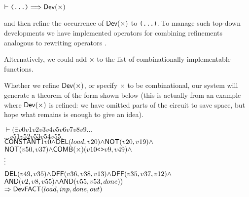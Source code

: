 \documentclass{llncs}
\begin{document}
\vspace*{-2mm}

{\baselineskip10pt\begin{alltt}
\( \vdash \texttt{(...)} \Longrightarrow \DEF{Dev}({\times}) \)
\end{alltt}}

\vspace*{-2mm}

\noindent and then refine the occurrence of $\mathsf{Dev}(\times)$
to \texttt{(...)}. To manage such top-down developments we have
implemented operators for combining refinements analogous to rewriting
operators \cite{paulson83}.

Alternatively, we could add
${\times}$ to the list of combinationally-implementable functions.

Whether we refine $\mathsf{Dev}(\times)$, or specify $\times$ to be
combinational, our system will generate a theorem of the form shown
below (this is actually from an example where $\mathsf{Dev}(\times)$ is
refined: we have omitted parts of the circuit to save space, but hope
what remains is enough to give an idea).

\vspace*{-2mm}

{\baselineskip10pt\begin{alltt}
\( \vdash ({\exists}v0 v1 v2 v3 v4 v5 v6 v7 v8 v9 ...                                             \)
\(      ... v51 v52 v53 v54 v55.                                                                       \)
\(     \DEF{CONSTANT} 1 v0 {\wedge} \DEF{DEL}(load,v20) {\wedge} \DEF{NOT}(v20,v19) {\wedge}       \)
\(     \DEF{NOT}(v50,v37) {\wedge} \DEF{COMB}({\times})(v10\texttt{<>}v9,v49) {\wedge}                     \)
      \(\raisebox{3mm}{\vdots}\)
\(     \DEF{DEL}(v49,v35) {\wedge} \DEF{DFF}(v36,v38,v13) {\wedge} \DEF{DFF}(v35,v37,v12) {\wedge} \)
\(     \DEF{AND}(v2,v8,v55) {\wedge} \DEF{AND}(v55,v53,done))                                     \)
\(    \Rightarrow \DEF{Dev} \DEF{FACT} (load,inp,done,out)                                         \)
\end{alltt}}

\vspace*{-2mm}
\end{document}
